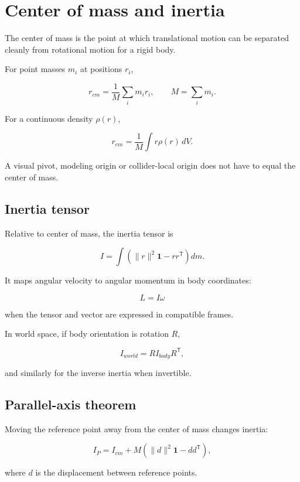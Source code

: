 \hypertarget{appendix-66742099f8a0}{}\label{referencestart:appendix-66742099f8a0}
\section{Center of mass and inertia}\label{appendix-66742099f8a0-center-of-mass-and-inertia}

The center of mass is the point at which translational motion can be separated cleanly from rotational motion for a rigid body.

For point masses \(m_i\) at positions \(r_i\),

\[
r_{cm}=\frac{1}{M}\sum_i m_i r_i,
\qquad
M=\sum_i m_i.
\]

For a continuous density \(\rho(r)\),

\[
r_{cm}=\frac{1}{M}\int r\rho(r)\,dV.
\]

A visual pivot, modeling origin or collider-local origin does not have to equal the center of mass.

\subsection{Inertia tensor}\label{appendix-66742099f8a0-inertia-tensor}

Relative to center of mass, the inertia tensor is

\[
I=
\int
\left(
\|r\|^2\mathbf{1}-rr^{\mathsf T}
\right)dm.
\]

It maps angular velocity to angular momentum in body coordinates:

\[
L=I\omega
\]

when the tensor and vector are expressed in compatible frames.

In world space, if body orientation is rotation \(R\),

\[
I_{world}=RI_{body}R^{\mathsf T},
\]

and similarly for the inverse inertia when invertible.

\subsection{Parallel-axis theorem}\label{appendix-66742099f8a0-parallel-axis-theorem}

Moving the reference point away from the center of mass changes inertia:

\[
I_P=
I_{cm}
+
M\left(
\|d\|^2\mathbf{1}-dd^{\mathsf T}
\right),
\]

where \(d\) is the displacement between reference points.

